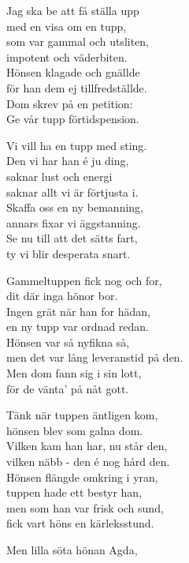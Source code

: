 \vspace{10pt}
Jag ska be att få ställa upp\\
med en visa om en tupp,\\
som var gammal och utsliten,\\
impotent och väderbiten.\\
Hönsen klagade och gnällde\\
för han dem ej tillfredställde.\\
Dom skrev på en petition:\\
Ge vår tupp förtidspension.\par
\vspace{10pt}
Vi vill ha en tupp med sting.\\
Den vi har han é ju ding,\\
saknar lust och energi\\
saknar allt vi är förtjusta i.\\
Skaffa oss en ny bemanning,\\
annars fixar vi äggstanning.\\
Se nu till att det sätts fart,\\
ty vi blir desperata snart.\par
\vspace{10pt}
Gammeltuppen fick nog och for,\\
dit där inga hönor bor.\\
Ingen grät när han for hädan,\\
en ny tupp var ordnad redan.\\
Hönsen var så nyfikna så,\\
men det var lång leveranstid på den.\\
Men dom fann sig i sin lott,\\
för de vänta' på nåt gott.\par
\newpage
Tänk när tuppen äntligen kom,\\
hönsen blev som galna dom.\\
Vilken kam han har, nu står den,\\
vilken näbb - den é nog hård den.\\
Hönsen flängde omkring i yran,\\
tuppen hade ett bestyr han,\\
men som han var frisk och sund,\\
fick vart höns en kärleksstund.\par
\vspace{10pt}
Men lilla söta hönan Agda,\\
